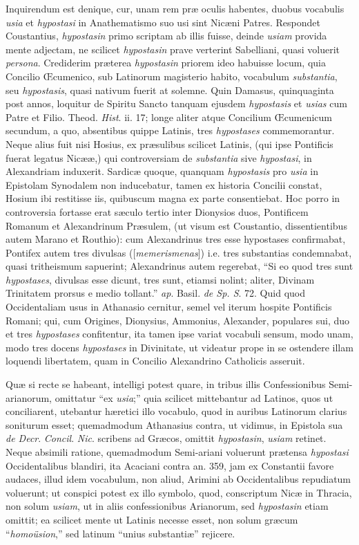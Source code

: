 Inquirendum
est denique, cur, unam rem præ oculis habentes, duobus vocabulis \emph{usia}
et \emph{hypostasi} in Anathematismo suo usi sint Nicæni Patres.
Respondet Coustantius, \emph{hypostasin} primo scriptam ab illis
fuisse, deinde \emph{usiam} provida mente adjectam, ne scilicet \emph{hypostasin}
prave verterint Sabelliani, quasi voluerit \emph{persona}. Crediderim
præterea \emph{hypostasin} priorem ideo habuisse locum, quia Concilio
Œcumenico, sub Latinorum magisterio habito, vocabulum \emph{substantia},
seu \emph{hypostasis}, quasi nativum fuerit at solemne. Quin Damasus,
quinquaginta post annos, loquitur de Spiritu Sancto tanquam ejusdem \emph{hypostasis}
et \emph{usias} cum Patre et Filio. Theod. \emph{Hist}. ii. 17; longe
aliter atque Concilium Œcumenicum secundum, a quo, absentibus quippe
Latinis, tres \emph{hypostases} commemorantur. Neque alius fuit nisi
Hosius, ex præsulibus scilicet Latinis, (qui ipse Pontificis fuerat
legatus Nicææ,) qui controversiam de \emph{substantia} sive \emph{hypostasi},
in Alexandriam induxerit. Sardicæ quoque, quanquam \emph{hypostasis}
pro \emph{usia} in Epistolam Synodalem non inducebatur, tamen ex
historia Concilii constat, Hosium ibi restitisse iis, quibuscum magna
ex parte consentiebat. Hoc porro in controversia fortasse erat sæculo
tertio inter Dionysios duos, Pontificem Romanum et Alexandrinum Præsulem,
(ut visum est Coustantio, dissentientibus autem Marano et Routhio):
cum Alexandrinus tres esse hypostases confirmabat, Pontifex autem tres
divulsas ([\emph{memerismenas}]) i.e. tres substantias condemnabat,
quasi tritheismum sapuerint; Alexandrinus autem regerebat, ``Si eo
quod tres sunt \emph{hypostases}, divulsas esse dicunt, tres sunt,
etiamsi nolint; aliter, Divinam Trinitatem prorsus e medio tollant.'' \emph{ap}.
Basil. \emph{de Sp. S}. 72. Quid quod Occidentaliam usus in Athanasio
cernitur, semel vel iterum hospite Pontificis Romani; qui, cum
Origines, Dionysius, Ammonius, Alexander, populares sui, duo et tres \emph{hypostases}
confitentur, ita tamen ipse variat vocabuli sensum, modo unam, modo
tres docens \emph{hypostases} in Divinitate, ut videatur prope in se
ostendere illam loquendi libertatem, quam in Concilio Alexandrino
Catholicis asseruit.

Quæ si
recte se habeant, intelligi potest quare, in tribus illis
Confessionibus Semi-arianorum, omittatur ``ex \emph{usia};'' quia
scilicet mittebantur ad
Latinos, quos ut conciliarent, utebantur hæretici illo vocabulo, quod
in auribus Latinorum clarius soniturum esset; quemadmodum Athanasius
contra, ut vidimus, in Epistola sua \emph{de Decr}. \emph{Concil}. \emph{Nic}.
scribens ad Græcos, omittit \emph{hypostasin}, \emph{usiam} retinet.
Neque absimili ratione, quemadmodum Semi-ariani voluerunt prætensa \emph{hypostasi}
Occidentalibus blandiri, ita Acaciani contra an. 359, jam ex
Constantii favore audaces, illud idem vocabulum, non aliud, Arimini ab
Occidentalibus repudiatum voluerunt; ut conspici potest ex illo
symbolo, quod, conscriptum Nicæ in Thracia, non solum \emph{usiam},
ut in aliis confessionibus Arianorum, sed \emph{hypostasin} etiam
omittit; ea scilicet mente ut Latinis necesse esset, non solum græcum
``\emph{homoüsion},'' sed latinum ``unius substantiæ'' rejicere.

